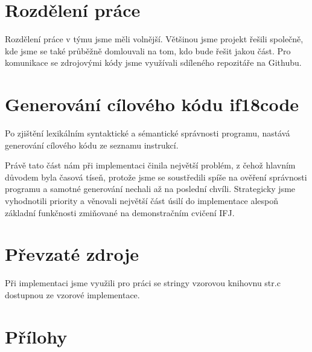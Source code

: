 \documentclass[12pt, a4paper]{article}
\begin{document}
\section{Rozdělení práce}
Rozdělení práce v týmu jsme měli volnější. Většinou jsme projekt řešili společně, kde jsme se také průběžně domlouvali na tom, kdo bude řešit jakou část. Pro komunikace se zdrojovými kódy jsme využívali sdíleného repozitáře na Githubu. \par

\section{Generování cílového kódu if18code}
Po zjištění lexikálním syntaktické a sémantické správnosti programu, nastává generování cílového kódu ze seznamu instrukcí. \par

Právě tato část nám při implementaci činila největší problém, z čehož hlavním důvodem byla časová tíseň, protože jsme se soustředili spíše na ověření správnosti programu a samotné generování nechali až na poslední chvíli. Strategicky jsme vyhodnotili priority a věnovali největší část úsilí do implementace alespoň základní funkčnosti zmiňované na demonstračním cvičení IFJ. \par

\section{Převzaté zdroje}
Při implementaci jsme využili pro práci se stringy vzorovou knihovnu str.c dostupnou ze vzorové implementace.

\newpage
\section{Přílohy}
\end{document}
